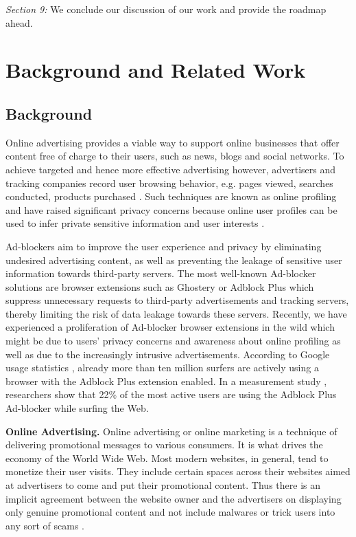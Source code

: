 \documentclass[runningheads,a4paper]{llncs}
\begin{document}
\textit{Section 9:} We conclude our discussion of our work and provide the roadmap ahead.


\section{Background and Related Work}

\subsection{Background}
Online advertising provides a viable way to support online businesses that offer content free of charge to their users, such as news, blogs and social networks. To
achieve targeted and hence more effective advertising however, advertisers and tracking companies record user browsing behavior, e.g. pages viewed, searches
conducted, products purchased \cite{Barford2014,Gill2013,Mayer2012}. Such techniques are known as online profiling and have raised significant privacy concerns because online user
profiles can be used to infer private sensitive information and user interests \cite{Castelluccia2012,Datta2015}.

Ad-blockers aim to improve the user experience and privacy by eliminating undesired advertising content, as well as preventing the leakage of sensitive user information towards third-party servers. The most well-known Ad-blocker solutions are browser extensions such as Ghostery or Adblock Plus which suppress unnecessary requests to third-party advertisements and tracking servers, thereby limiting the risk of data leakage towards these servers. Recently, we have experienced
a proliferation of Ad-blocker browser extensions in the wild which might be due to users’ privacy concerns and awareness about online profiling as well as due to the increasingly intrusive advertisements. According to Google usage statistics \cite{Google2018}, already more than ten million surfers are actively using a browser with the Adblock Plus extension enabled. In a  measurement study \cite{Pujol2015}, researchers show that 22\% of the most active users are using the Adblock Plus Ad-blocker while surfing the Web.

\textbf{Online Advertising.} Online advertising or online marketing is a technique of delivering promotional messages to various consumers. It is what drives the economy of the World Wide Web. Most modern websites, in general, tend to monetize their user visits. They include certain spaces across their websites aimed at advertisers to come and put their promotional content. Thus there is an implicit agreement between the website owner and the advertisers on displaying only genuine promotional content and not include malwares or trick users into any sort of scams \cite{Apostolis2014}.
\end{document}
